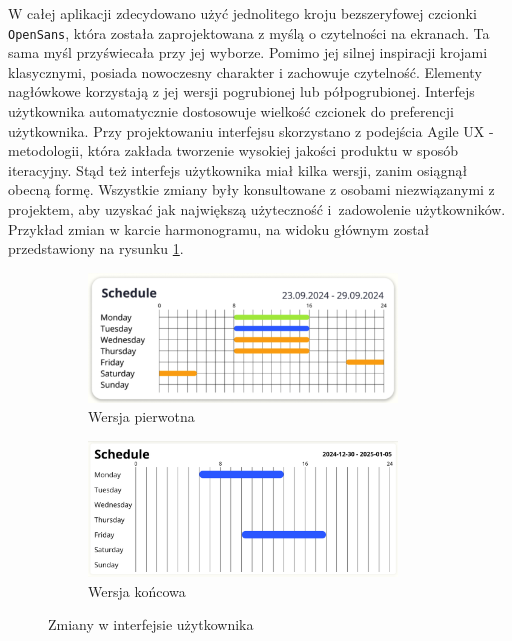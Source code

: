 W całej aplikacji zdecydowano użyć jednolitego kroju bezszeryfowej czcionki \texttt{Open\nolinebreak Sans}, która została zaprojektowana z myślą o czytelności na ekranach. Ta sama myśl przyświecała przy jej wyborze. Pomimo jej silnej inspiracji krojami klasycznymi, posiada nowoczesny charakter i zachowuje czytelność. Elementy nagłówkowe korzystają z jej wersji pogrubionej lub półpogrubionej. Interfejs użytkownika automatycznie dostosowuje wielkość czcionek do preferencji użytkownika.
\newpage
Przy projektowaniu interfejsu skorzystano z podejścia Agile UX - metodologii, która zakłada tworzenie wysokiej jakości produktu w sposób iteracyjny. Stąd też interfejs użytkownika miał kilka wersji, zanim osiągnął obecną formę. Wszystkie zmiany były konsultowane z osobami niezwiązanymi z projektem, aby uzyskać jak największą użyteczność i~zadowolenie użytkowników. Przykład zmian w karcie harmonogramu, na widoku głównym został przedstawiony na rysunku \ref{fig:uxChanges}.

\begin{figure}[H]
    \centering
    \begin{subfigure}[b]{0.49\textwidth}
        \centering
        \includegraphics[width=0.9\textwidth, frame]{graf/sch1.png}
        \caption{Wersja pierwotna}
    \end{subfigure}
    \begin{subfigure}[b]{0.49\textwidth}
        \centering
        \includegraphics[width=0.9\textwidth, frame]{graf/schE.png}
        \caption{Wersja końcowa}
    \end{subfigure}
    \caption{Zmiany w interfejsie użytkownika}
    \label{fig:uxChanges}
\end{figure}

